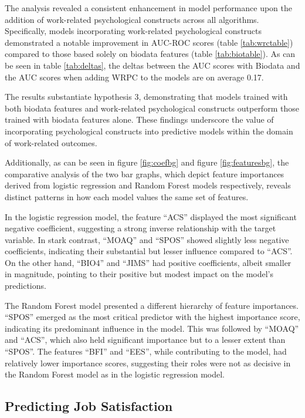 \documentclass[
  man]{apa7}
\begin{document}
The analysis revealed a consistent enhancement in model performance upon the addition of work-related psychological constructs across all algorithms. Specifically, models incorporating work-related psychological constructs demonstrated a notable improvement in AUC-ROC scores (table \ref{tab:wrctable}) compared to those based solely on biodata features (table \ref{tab:biotable}). As can be seen in table \ref{tab:deltas}, the deltas between the AUC scores with Biodata and the AUC scores when adding WRPC to the models are on average 0.17.

The results substantiate hypothesis 3, demonstrating that models trained with both biodata features and work-related psychological constructs outperform those trained with biodata features alone. These findings underscore the value of incorporating psychological constructs into predictive models within the domain of work-related outcomes.

Additionally, as can be seen in figure \ref{fig:coefbg} and figure \ref{fig:featuresbg}, the comparative analysis of the two bar graphs, which depict feature importances derived from logistic regression and Random Forest models respectively, reveals distinct patterns in how each model values the same set of features.

In the logistic regression model, the feature ``ACS'' displayed the most significant negative coefficient, suggesting a strong inverse relationship with the target variable. In stark contrast, ``MOAQ'' and ``SPOS'' showed slightly less negative coefficients, indicating their substantial but lesser influence compared to ``ACS''. On the other hand, ``BIO4'' and ``JIMS'' had positive coefficients, albeit smaller in magnitude, pointing to their positive but modest impact on the model's predictions.

The Random Forest model presented a different hierarchy of feature importances. ``SPOS'' emerged as the most critical predictor with the highest importance score, indicating its predominant influence in the model. This was followed by ``MOAQ'' and ``ACS'', which also held significant importance but to a lesser extent than ``SPOS''. The features ``BFI'' and ``EES'', while contributing to the model, had relatively lower importance scores, suggesting their roles were not as decisive in the Random Forest model as in the logistic regression model.

\subsection{Predicting Job Satisfaction}\label{predicting-job-satisfaction}
\end{document}

